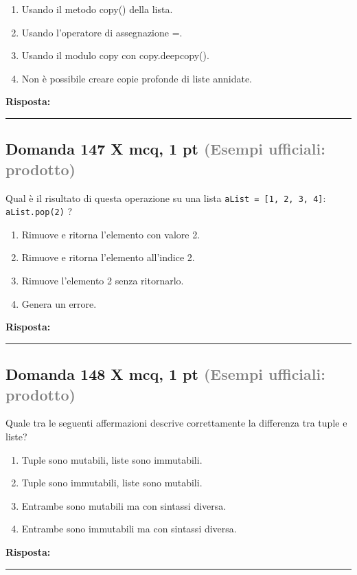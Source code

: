 \documentclass[a4paper,11pt]{article}
\begin{document}
\begin{enumerate}[label=\alph*)]
\item Usando il metodo copy() della lista.
\item Usando l'operatore di assegnazione =.
\item Usando il modulo copy con copy.deepcopy().
\item Non è possibile creare copie profonde di liste annidate.
\end{enumerate}
\vspace{0.2cm}
\noindent\textbf{Risposta:}\par
\vspace{1.5cm}\hrule


\subsection*{Domanda 147 X \hfill {\small mcq, 1 pt \textcolor{gray}{(Esempi ufficiali: prodotto)}}}
Qual è il risultato di questa operazione su una lista \texttt{aList = [1, 2, 3, 4]}: \texttt{aList.pop(2)} ?

\begin{enumerate}[label=\alph*)]
\item Rimuove e ritorna l'elemento con valore 2.
\item Rimuove e ritorna l'elemento all'indice 2.
\item Rimuove l'elemento 2 senza ritornarlo.
\item Genera un errore.
\end{enumerate}
\vspace{0.2cm}
\noindent\textbf{Risposta:}\par
\vspace{1.5cm}\hrule


\subsection*{Domanda 148 X \hfill {\small mcq, 1 pt \textcolor{gray}{(Esempi ufficiali: prodotto)}}}
Quale tra le seguenti affermazioni descrive correttamente la differenza tra tuple e liste?

\begin{enumerate}[label=\alph*)]
\item Tuple sono mutabili, liste sono immutabili.
\item Tuple sono immutabili, liste sono mutabili.
\item Entrambe sono mutabili ma con sintassi diversa.
\item Entrambe sono immutabili ma con sintassi diversa.
\end{enumerate}
\vspace{0.2cm}
\noindent\textbf{Risposta:}\par
\vspace{1.5cm}\hrule
\end{document}

